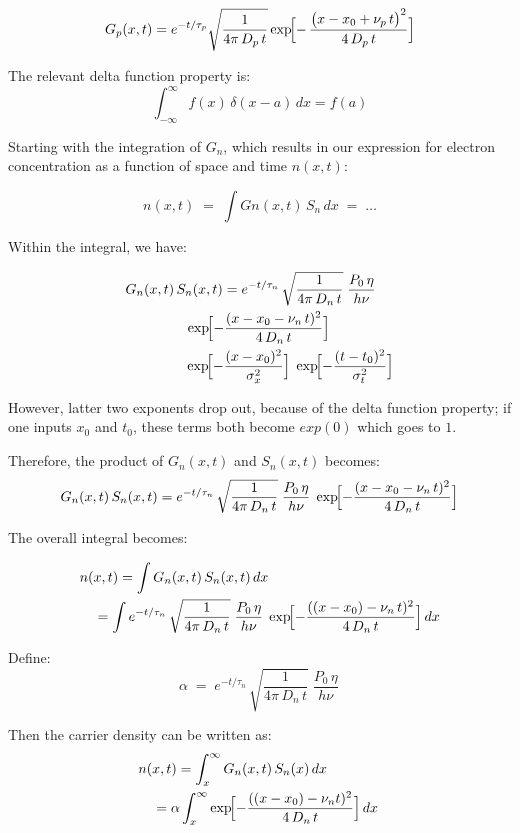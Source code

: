 \documentclass[
  journal,
]{IEEEtran}%
\begin{document}
\[
G_p(x,t)
= e^{-t/\tau_p}
\sqrt{\frac{1}{4\pi\,D_p\,t}}
\exp\!\Bigl[-\,\frac{\bigl(x - x_0 + \nu_p\,t\bigr)^2}{4\,D_p\,t}\Bigr]
\]

The relevant delta function property is: \[
\int_{-\infty}^{\infty} f(x)\,\delta(x - a)\,dx = f(a)
\]

Starting with the integration of \(G_n\), which results in our
expression for electron concentration as a function of space and time
\(n(x,t)\):

\[
n(x,t) \;=\; \int G{n}(x,t)\,S_{n}\,dx \;=\;\dots
\]

Within the integral, we have:

\[
\begin{multlined}
G_n(x,t)\,S_n(x,t)
= e^{-t/\tau_n}\,\sqrt{\frac{1}{4\pi\,D_n\,t}}\;\frac{P_0\,\eta}{h\nu}
\;
\\
\exp\!\Bigl[-\frac{(x - x_0 - \nu_n\,t)^2}{4\,D_n\,t}\Bigr]
\;
\\
\exp\!\Bigl[-\frac{(x - x_0)^2}{\sigma_x^2}\Bigr]
\;\exp\!\Bigl[-\frac{(t - t_0)^2}{\sigma_t^2}\Bigr]
\end{multlined}
\]

However, latter two exponents drop out, because of the delta function
property; if one inputs \(x_0\) and \(t_0\), these terms both become
\(exp(0)\) which goes to \(1\).

Therefore, the product of \(G_n(x,t)\) and \(S_n(x,t)\) becomes: \[
G_n(x,t)\,S_n(x,t)
= e^{-t/\tau_n}\,\sqrt{\frac{1}{4\pi\,D_n\,t}}\;\frac{P_0\,\eta}{h\nu}
\;\exp\!\Bigl[-\frac{(x - x_0 - \nu_n\,t)^2}{4\,D_n\,t}\Bigr]
\]

The overall integral becomes:

\[
\begin{multlined}
n(x,t)
= \int G_n(x,t)\,S_n(x,t)\,dx
\\
= \int
e^{-t/\tau_n}\,\sqrt{\frac{1}{4\pi\,D_n\,t}}\;\frac{P_0\,\eta}{h\nu}
\;\exp\!\Bigl[-\frac{((x - x_0) - \nu_n\,t)^2}{4\,D_n\,t}\Bigr]
\,dx
\end{multlined}
\]

Define: \[
\alpha \;=\; e^{-t/\tau_n}\,
\sqrt{\frac{1}{4\pi\,D_n\,t}}\;\frac{P_0\,\eta}{h\nu}\,
\]

Then the carrier density can be written as: \[
\begin{multlined}
n(x,t)
= \int_{x}^{\infty}G_n(x,t)\,S_n(x)\,dx
\\
= \alpha
\int_{x}^{\infty}
\exp\!\Bigl[-\frac{((x - x_0) - \nu_n t)^2}{4\,D_n\,t}\Bigr]
\,dx\,
\end{multlined}
\]
\end{document}
